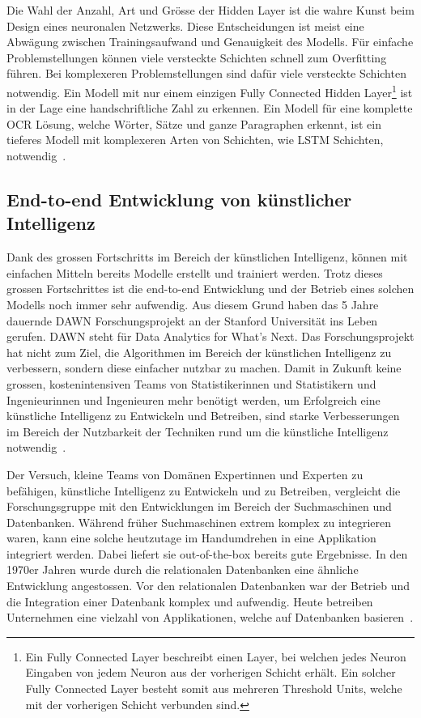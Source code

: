 Die Wahl der Anzahl, Art und Grösse der Hidden Layer ist die wahre Kunst beim Design eines neuronalen Netzwerks. Diese Entscheidungen ist meist eine Abwägung zwischen Trainingsaufwand und Genauigkeit des Modells. Für einfache Problemstellungen können viele versteckte Schichten schnell zum Overfitting führen. Bei komplexeren Problemstellungen sind dafür viele versteckte Schichten notwendig. Ein Modell mit nur einem einzigen Fully Connected Hidden Layer\footnote{Ein Fully Connected Layer beschreibt einen Layer, bei welchen jedes Neuron Eingaben von jedem Neuron aus der vorherigen Schicht erhält. Ein solcher Fully Connected Layer besteht somit aus mehreren Threshold Units, welche mit der vorherigen Schicht verbunden sind.} ist in der Lage eine handschriftliche Zahl zu erkennen. Ein Modell für eine komplette OCR Lösung, welche Wörter, Sätze und ganze Paragraphen erkennt, ist ein tieferes Modell mit komplexeren Arten von Schichten, wie LSTM Schichten, notwendig~\autocite{NNDesign}.

\subsection{End-to-end Entwicklung von künstlicher Intelligenz}
\label{chap:DAWN}

Dank des grossen Fortschritts im Bereich der künstlichen Intelligenz, können mit einfachen Mitteln bereits Modelle erstellt und trainiert werden. Trotz dieses grossen Fortschrittes ist die end-to-end Entwicklung und der Betrieb eines solchen Modells noch immer sehr aufwendig. Aus diesem Grund haben \textcite{DAWN} das 5 Jahre dauernde DAWN Forschungsprojekt an der Stanford Universität ins Leben gerufen. DAWN steht für Data Analytics for What's Next. Das Forschungsprojekt hat nicht zum Ziel, die Algorithmen im Bereich der künstlichen Intelligenz zu verbessern, sondern diese einfacher nutzbar zu machen. Damit in Zukunft keine grossen, kostenintensiven Teams von Statistikerinnen und Statistikern und Ingenieurinnen und Ingenieuren mehr benötigt werden, um Erfolgreich eine künstliche Intelligenz zu Entwickeln und Betreiben, sind starke Verbesserungen im Bereich der Nutzbarkeit der Techniken rund um die künstliche Intelligenz notwendig~\autocite{DAWN}.

Der Versuch, kleine Teams von Domänen Expertinnen und Experten zu befähigen, künstliche Intelligenz zu Entwickeln und zu Betreiben, vergleicht die Forschungsgruppe mit den Entwicklungen im Bereich der Suchmaschinen und Datenbanken. Während früher Suchmaschinen extrem komplex zu integrieren waren, kann eine solche heutzutage im Handumdrehen in eine Applikation integriert werden. Dabei liefert sie out-of-the-box bereits gute Ergebnisse. In den 1970er Jahren wurde durch die relationalen Datenbanken eine ähnliche Entwicklung angestossen. Vor den relationalen Datenbanken war der Betrieb und die Integration einer Datenbank komplex und aufwendig. Heute betreiben Unternehmen eine vielzahl von Applikationen, welche auf Datenbanken basieren~\autocite{DAWN}.

